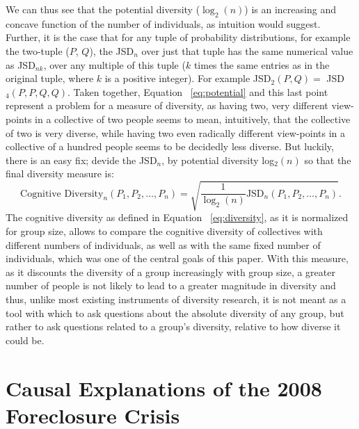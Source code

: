 \documentclass[12pt]{article}
\begin{document}
We can thus see that the potential diversity ($\log_2(n)$) is an increasing and concave function of the number of individuals, as intuition would suggest.
Further, it is the case that for any tuple of probability distributions, for example the two-tuple ($P$, $Q$), the JSD$_n$ over just that tuple has the same numerical value as JSD$_{nk}$, over any multiple of this tuple ($k$ times the same entries as in the original tuple, where $k$ is a positive integer). For example JSD$_2(P, Q)=$ JSD$_4(P, P, Q, Q)$. Taken together, Equation ~\ref{eq:potential} and this last point represent a problem for a measure of diversity, as having two, very different view-points in a collective of two people seems to mean, intuitively, that the collective of two is very diverse, while having two even radically different view-points in a collective of a hundred people seems to be decidedly less diverse. But luckily, there is an easy fix; devide the JSD$_n$, by potential diversity log$_2(n)$ so that the final diversity measure is:
\begin{equation} \label{eq:diversity}
\text{Cognitive Diversity}_n(P_1, P_2, \ldots, P_n)=\sqrt{\frac{1}{\log_2(n)}\text{JSD}_n(P_1, P_2, \ldots, P_n)}.
\end{equation}
The cognitive diversity as defined in Equation ~\ref{eq:diversity}, as it is normalized for group size, allows to compare the cognitive diversity of collectives with different numbers of individuals, as well as with the same fixed number of individuals, which was one of the central goals of this paper. With this measure, as it discounts the diversity of a group increasingly with group size, a greater number of people is not likely to lead to a greater magnitude in diversity and thus, unlike most existing instruments of diversity research, it is not meant as a tool with which to ask questions about the absolute diversity of any group, but rather to ask questions related to a group's diversity, relative to how diverse it could be.

\section{Causal Explanations of the 2008 Foreclosure Crisis}
\end{document}
